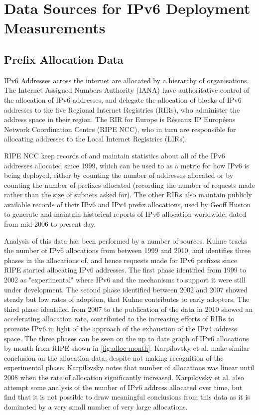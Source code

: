 \section{Data Sources for IPv6 Deployment Measurements}

\subsection{Prefix Allocation Data}

IPv6 Addresses across the internet are allocated by a hierarchy of organisations.
The Internet Assigned Numbers Authority (IANA) have authoritative control of the
allocation of IPv6 addresses, and delegate the allocation of blocks of IPv6
addresses to the five Regional Internet Registries (RIRs), who administer the
address space in their region. The RIR for Europe is Réseaux IP Européens
Network Coordination Centre (RIPE NCC), who in turn are responsible for
allocating addresses to the Local Internet Registries (LIRs).

RIPE NCC keep records of and maintain statistics about all of the IPv6 addresses
allocated since 1999, which can be used to as a metric for how IPv6 is being
deployed, either by counting the number of addresses allocated or by counting
the number of prefixes allocated (recording the number of requests made rather
than the size of subnets asked for). The other RIRs also maintain publicly
available records of their IPv6 and IPv4 prefix allocations, used by Geoff
Huston to generate and maintain historical
reports of IPv6 allocation worldwide, dated from mid-2006 to
present day.

Analysis of this data has been performed by a number of sources. Kuhne tracks
the number of IPv6 allocations from between 1999 and 2010, and identifies three
phases in the allocations of, and hence requests made for IPv6 prefixes since
RIPE started allocating IPv6 addresses. The first phase identified from 1999 to
2002 as "experimental" where IPv6 and the mechanisms to support it were still
under development. The second phase identified between 2002 and 2007 showed
steady but low rates of adoption, that Kuhne contributes to early adopters. The
third phase identified from 2007 to the publication of the data in 2010 showed
an accelerating allocation rate, contributed to the increasing efforts of RIRs
to promote IPv6 in light of the approach of the exhaustion of the IPv4 address
space. The three phases can be seen on the up to date graph of IPv6 allocations
by month from RIPE shown in \ref{fig:alloc-month}. Karpilovsky et al. make
similar conclusion on the allocation data, despite not making recognition of the
experimental phase, Karpilovsky notes that number of allocations was linear
until 2008 when the rate of allocation significantly increased. Karpilovsky et
al. also attempt some analysis of the number of IPv6 address allocated over
time, but find that it is not possible to draw meaningful conclusions from this
data as it is dominated by a very small number of very large allocations.

